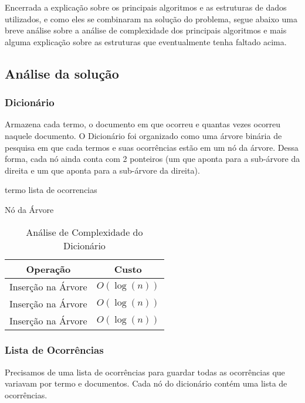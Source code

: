 \documentclass[12pt]{article}
\begin{document}
Encerrada a explicação sobre os principais algoritmos e as estruturas de dados
utilizados, e como eles se combinaram na solução do problema, segue abaixo uma
breve análise sobre a análise de complexidade dos principais algoritmos e mais
alguma explicação sobre as estruturas que eventualmente tenha faltado acima.

\subsection{Análise da solução}

\subsubsection{Dicionário}
Armazena cada termo, o documento em que ocorreu e quantas
vezes ocorreu naquele documento. O Dicionário foi organizado como uma árvore 
binária de pesquisa em que cada termos e suas ocorrências estão em um nó da 
árvore. Dessa forma, cada nó ainda conta com 2 ponteiros (um que aponta para 
a sub-árvore da direita e um que aponta para a sub-árvore da direita).

\begin{algorithm}[h!]
\begin{footnotesize}
	termo\;
	lista de ocorrencias\;
\caption{Nó da Árvore}
\end{footnotesize}
\end{algorithm}

\begin{table}[ht]
  \caption{Análise de Complexidade do Dicionário}
  \centering
  \begin{tabular}{c c}
  \hline\hline
  Operação & Custo \\ [0.5ex]
  \hline
  Inserção na Árvore & $O(\log(n))$ \\
  Inserção na Árvore & $O(\log(n))$ \\
  Inserção na Árvore & $O(\log(n))$ \\
  \hline
  \end{tabular}
  \label{table:nonlin}
\end{table}

\subsubsection{Lista de Ocorrências}

Precisamos de uma lista de ocorrências para guardar todas as ocorrências que
variavam por termo e documentos. Cada nó do dicionário contém uma lista de
ocorrências.
\end{document}
